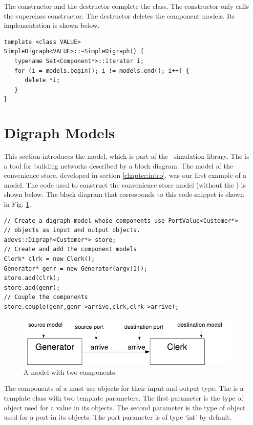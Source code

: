 The constructor and the destructor complete the class. The constructor only calls the superclass constructor. The destructor deletes the component models. Its implementation is shown below.
\begin{verbatim}
template <class VALUE>
SimpleDigraph<VALUE>::~SimpleDigraph() {
   typename Set<Component*>::iterator i;
   for (i = models.begin(); i != models.end(); i++) {
      delete *i;
   }
}
\end{verbatim}

\section{Digraph Models}
\label{section:digraph_models}
This section introduces the  model, which is part of the \adevs\ simulation library. The  is a tool for building networks described by a block diagram. The model of the convenience store, developed in section \ref{chapter:intro}, was our first example of a  model. The code used to construct the convenience store model (without the ) is shown below. The block diagram that corresponds to this code snippet is shown in Fig. \ref{fig:two_component_diagram}.
\begin{verbatim}
// Create a digraph model whose components use PortValue<Customer*>
// objects as input and output objects.
adevs::Digraph<Customer*> store;
// Create and add the component models
Clerk* clrk = new Clerk();
Generator* genr = new Generator(argv[1]);
store.add(clrk);
store.add(genr);
// Couple the components
store.couple(genr,genr->arrive,clrk,clrk->arrive);
\end{verbatim}
\begin{figure}[ht]
\centering
\includegraphics{network_models_figs/two_component_model.pdf}
\caption{A  model with two components.}
\label{fig:two_component_diagram}
\end{figure}

The components of a  must use  objects for their input and output type. The  is a template class with two template parameters. The first parameter is the type of object used for a value in its  objects. The second parameter is the type of object used for a port in its  objects. The port parameter is of type `int' by default.

